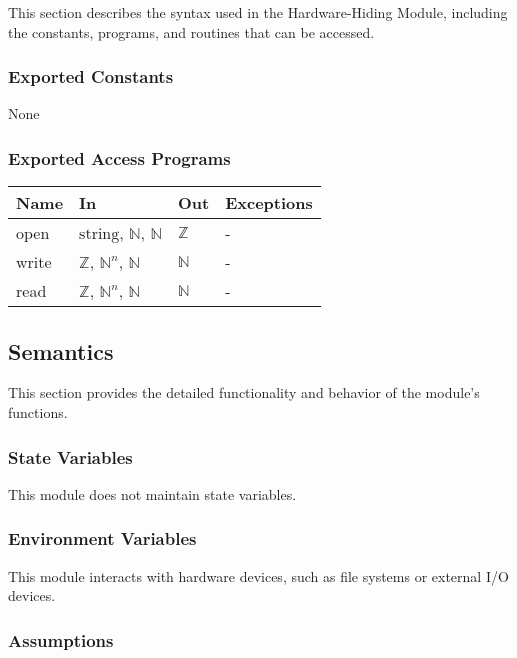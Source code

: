 \documentclass[12pt, titlepage]{article}
\begin{document}
This section describes the syntax used in the Hardware-Hiding Module, including
the constants, programs, and routines that can be accessed.

\subsubsection{Exported Constants}

None

\subsubsection{Exported Access Programs}

\begin{center}
\begin{tabular}{p{2cm} p{4cm} p{4cm} p{2cm}}
\hline
\textbf{Name} & \textbf{In} & \textbf{Out} & \textbf{Exceptions} \\
\hline
open & $\text{string}$, $\mathbb{N}$, $\mathbb{N}$ & $\mathbb{Z}$ & - \\
write & $\mathbb{Z}$, $\mathbb{N}^n$, $\mathbb{N}$ & $\mathbb{N}$ & - \\
read & $\mathbb{Z}$, $\mathbb{N}^n$, $\mathbb{N}$ & $\mathbb{N}$ & - \\
\hline
\end{tabular}
\end{center}

\subsection{Semantics}

This section provides the detailed functionality and behavior of the module’s
functions.

\subsubsection{State Variables}

This module does not maintain state variables.

\subsubsection{Environment Variables}

This module interacts with hardware devices, such as file systems or external
I/O devices.

\subsubsection{Assumptions}
\end{document}

